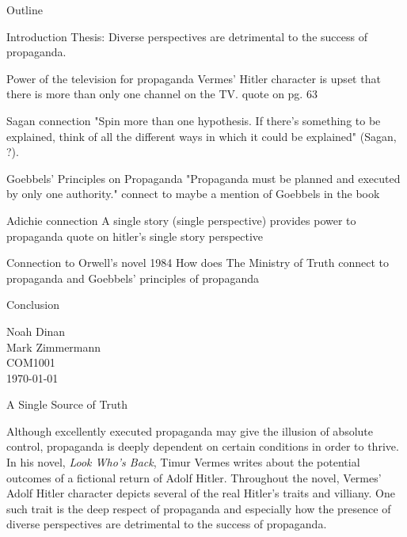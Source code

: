 \documentclass[12pt]{article}
\begin{document}
\begin{center}
Outline
\end{center}

\begin{outline}[enumerate]
\1 Introduction
    \2 Thesis: Diverse perspectives are detrimental to the success of propaganda.

\1 Power of the television for propaganda
    \2 Vermes' Hitler character is upset that there is more than only one channel on the TV.
    \2 quote on pg. 63

\1 Sagan connection
    \2 "Spin more than one hypothesis. If there’s something to be explained, 
        think of all the different ways in which it could be explained" (Sagan, ?).

\1 Goebbels' Principles on Propaganda
    \2 "Propaganda must be planned and executed by only one authority."
    \2 connect to maybe a mention of Goebbels in the book

\1 Adichie connection
    \2 A single story (single perspective) provides power to propaganda
    \2 quote on hitler's single story perspective

\1 Connection to Orwell's novel 1984
    \2 How does The Ministry of Truth connect to propaganda and Goebbels'
       principles of propaganda

\1 Conclusion

\end{outline}

\newpage

\noindent
Noah Dinan \\ Mark Zimmermann \\ COM1001 \\ \today \\

\begin{center}
A Single Source of Truth
\end{center}

\setlength{\parindent}{0.5in}

Although excellently executed propaganda may give the illusion of absolute control, propaganda is
deeply dependent on certain conditions in order to thrive. In his novel, \textit{Look Who's Back}, Timur Vermes
writes about the potential outcomes of a fictional return of Adolf Hitler. Throughout the novel, Vermes'
Adolf Hitler character depicts several of the real Hitler's traits and villiany. One such trait is the 
deep respect of propaganda and especially how the presence of diverse perspectives are detrimental to the
success of propaganda.
\end{document}
